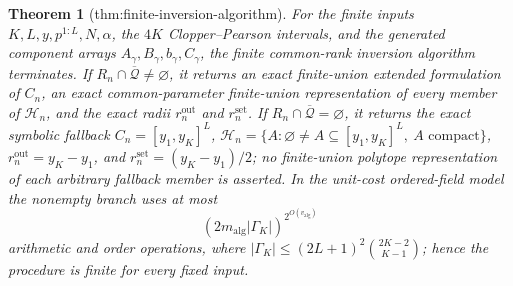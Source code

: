 \documentclass{article}
\newtheorem{theorem}{Theorem}
\begin{document}
\begin{theorem}[thm:finite-inversion-algorithm]\label{thm:finite-inversion-algorithm}
For the finite inputs \(K,L,y,p^{1:L},N,\alpha\), the \(4K\) Clopper--Pearson intervals, and the generated component arrays \(A_\gamma,B_\gamma,b_\gamma,C_\gamma\), the finite common-rank inversion algorithm terminates.  If \(R_n\cap\overline{\mathcal Q}\ne\varnothing\), it returns an exact finite-union extended formulation of \(C_n\), an exact common-parameter finite-union representation of every member of \(\mathcal H_n\), and the exact radii \(r_n^{\mathrm{out}}\) and \(r_n^{\mathrm{set}}\).  If \(R_n\cap\overline{\mathcal Q}=\varnothing\), it returns the exact symbolic fallback \(C_n=[y_1,y_K]^L\), \(\mathcal H_n=\{A:\varnothing\ne A\subseteq[y_1,y_K]^L,\ A\text{ compact}\}\), \(r_n^{\mathrm{out}}=y_K-y_1\), and \(r_n^{\mathrm{set}}=(y_K-y_1)/2\); no finite-union polytope representation of each arbitrary fallback member is asserted.  In the unit-cost ordered-field model the nonempty branch uses at most
\[
(2m_{\mathrm{alg}}|\Gamma_K|)^{2^{O(v_{\mathrm{alg}})}}
\]
arithmetic and order operations, where \(|\Gamma_K|\le(2L+1)^2\binom{2K-2}{K-1}\); hence the procedure is finite for every fixed input.
\end{theorem}
\end{document}

